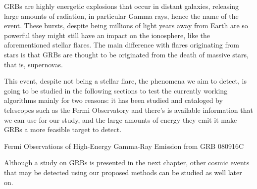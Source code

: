 GRBs are highly energetic explosions that occur in distant galaxies, releasing large amounts of radiation, in particular Gamma rays, hence the name of the event. These bursts, despite being millions of light years away from Earth are so powerful they might still have an impact on the ionosphere, like the aforementioned stellar flares. 
The main difference with flares originating from stars is that GRBs are thought to be originated from the death of massive stars, that is, supernovas.

This event, despite not being a stellar flare, the phenomena we aim to detect, is going to be studied in the following sections to test the currently working algorithms mainly for two reasons: it has been studied and cataloged by telescopes such as the Fermi Observatory and there’s is available information that we can use for our study, and the large amounts of energy they emit it make GRBs a more feasible target to detect.

{Fermi Observations of High-Energy Gamma-Ray Emission from GRB 080916C}

Although a study on GRBs is presented in the next chapter, other cosmic events that may be detected using our proposed methods can be studied as well later on.




